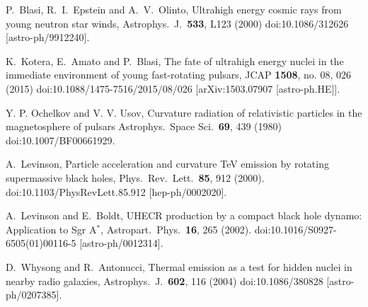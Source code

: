 \documentclass[aps,prd,twocolumn,superscriptaddress,tightenlines,nofootinbib]{revtex4-1}
\begin{document}
\begin{thebibliography}{99}
  P.~Blasi, R.~I.~Epstein and A.~V.~Olinto,
  {\color{rossoCP3} Ultrahigh energy cosmic rays from young neutron star winds},
  Astrophys.\ J.\  {\bf 533}, L123 (2000)
  doi:10.1086/312626
  [astro-ph/9912240].



  K.~Kotera, E.~Amato and P.~Blasi,
  {\color{rossoCP3} The fate of ultrahigh energy nuclei in the immediate environment of young fast-rotating pulsars},
  JCAP {\bf 1508}, no. 08, 026 (2015)
  doi:10.1088/1475-7516/2015/08/026
  [arXiv:1503.07907 [astro-ph.HE]].








Y. P. Ochelkov and V. V. Usov,
{\color{rossoCP3} Curvature radiation of relativistic particles in the
  magnetosphere of pulsars}
 Astrophys.\ Space Sci.\  {\bf 69},  439 (1980)
doi:10.1007/BF00661929.



  A.~Levinson,
  {\color{rossoCP3} Particle acceleration and curvature TeV emission by rotating supermassive black holes},
  Phys.\ Rev.\ Lett.\  {\bf 85}, 912 (2000).
  doi:10.1103/PhysRevLett.85.912
 [hep-ph/0002020].


  A.~Levinson and E.~Boldt,
  {\color{rossoCP3} UHECR production by a compact black hole dynamo: Application to Sgr A$^*$},
  Astropart.\ Phys.\  {\bf 16}, 265 (2002).
  doi:10.1016/S0927-6505(01)00116-5
 [astro-ph/0012314].


  D.~Whysong and R.~Antonucci,
   {\color{rossoCP3} Thermal emission as a test for hidden nuclei in nearby radio galaxies},
  Astrophys.\ J.\  {\bf 602}, 116 (2004)
  doi:10.1086/380828
  [astro-ph/0207385].



\end{thebibliography}
\end{document}
